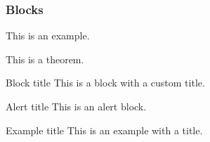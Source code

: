 \begin{frame}\frametitle{Blocks}

\begin{example}
This is an example.
\end{example}

\begin{theorem}
This is a theorem.
\end{theorem}

\begin{block}{Block title}
This is a block with a custom title.
\end{block}

\begin{alertblock}{Alert title}
This is an alert block.
\end{alertblock}

\begin{exampleblock}{Example title}
This is an example with a title.
\end{exampleblock}

\end{frame}


